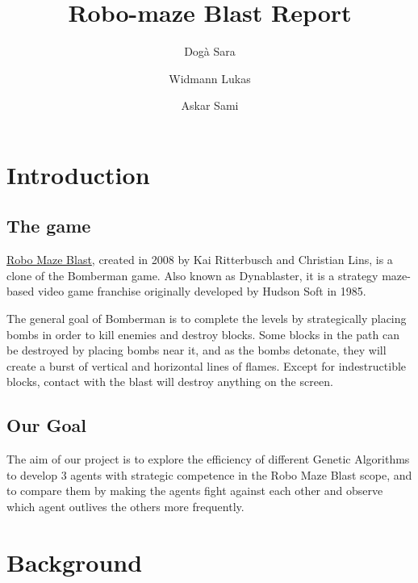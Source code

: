 \documentclass[sigconf]{acmart} %
\title{Robo-maze Blast Report}
\author{Dogà Sara}
\author{Widmann Lukas}
\author{Askar Sami}
\begin{document}
\maketitle



\section{Introduction}

\subsection{The game}
\href{https://codeberg.org/chrlns/robo-maze-blast.git}{Robo Maze Blast}, created in 2008 by Kai Ritterbusch and Christian Lins, is a clone of the Bomberman game. Also known as Dynablaster, it is a strategy maze-based video game franchise originally developed by Hudson Soft in 1985. 

The general goal of Bomberman is to complete the levels by strategically placing bombs in order to kill enemies and destroy blocks. Some blocks in the path can be destroyed by placing bombs near it, and as the bombs detonate, they will create a burst of vertical and horizontal lines of flames. Except for indestructible blocks, contact with the blast will destroy anything on the screen.

\subsection{Our Goal}
The aim of our project is to explore the efficiency of different Genetic Algorithms to develop 3 agents with strategic competence in the Robo Maze Blast scope, and to compare them by making the agents fight against each other and observe which agent outlives the others more frequently.

\section{Background}
\end{document}
